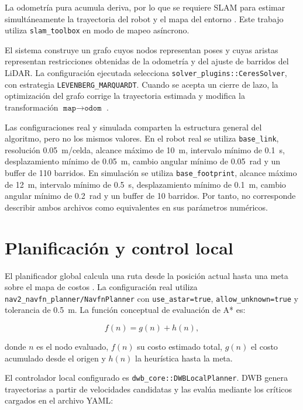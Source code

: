 La odometría pura acumula deriva, por lo que se requiere SLAM para estimar simultáneamente la trayectoria del robot y el mapa del entorno \citep{ngoc2023efficient}. Este trabajo utiliza \texttt{slam\_toolbox} en modo de mapeo asíncrono.

El sistema construye un grafo cuyos nodos representan poses y cuyas aristas representan restricciones obtenidas de la odometría y del ajuste de barridos del LiDAR. La configuración ejecutada selecciona \texttt{solver\_plugins::CeresSolver}, con estrategia \texttt{LEVENBERG\_MARQUARDT}. Cuando se acepta un cierre de lazo, la optimización del grafo corrige la trayectoria estimada y modifica la transformación $\texttt{map}\rightarrow\texttt{odom}$ \citep{macenski2021slamtoolbox}.

Las configuraciones real y simulada comparten la estructura general del algoritmo, pero no los mismos valores. En el robot real se utiliza \texttt{base\_link}, resolución 0.05~m/celda, alcance máximo de 10~m, intervalo mínimo de 0.1~s, desplazamiento mínimo de 0.05~m, cambio angular mínimo de 0.05~rad y un buffer de 110 barridos. En simulación se utiliza \texttt{base\_footprint}, alcance máximo de 12~m, intervalo mínimo de 0.5~s, desplazamiento mínimo de 0.1~m, cambio angular mínimo de 0.2~rad y un buffer de 10 barridos. Por tanto, no corresponde describir ambos archivos como equivalentes en sus parámetros numéricos.

\section{Planificación y control local}
\label{sec:nav_marco}

El planificador global calcula una ruta desde la posición actual hasta una meta sobre el mapa de costos \citep{lavalle2006planning}. La configuración real utiliza \texttt{nav2\_navfn\_planner/NavfnPlanner} con \texttt{use\_astar=true}, \texttt{allow\_unknown=true} y tolerancia de 0.5~m. La función conceptual de evaluación de A* es:

\begin{equation}
f(n)=g(n)+h(n),
\label{eq:astar}
\end{equation}

\noindent donde $n$ es el nodo evaluado, $f(n)$ su costo estimado total, $g(n)$ el costo acumulado desde el origen y $h(n)$ la heurística hasta la meta.

El controlador local configurado es \texttt{dwb\_core::DWBLocalPlanner}. DWB genera trayectorias a partir de velocidades candidatas y las evalúa mediante los críticos cargados en el archivo YAML:


